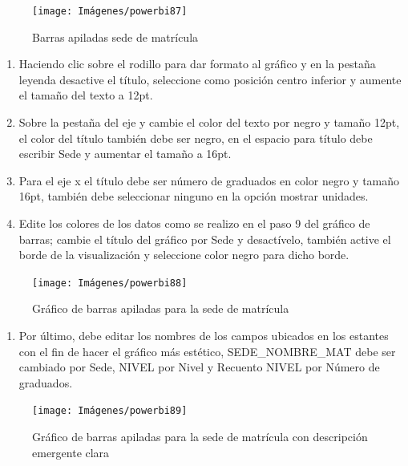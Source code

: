 \documentclass[
]{book}
\providecommand{\tightlist}{%
  \setlength{\itemsep}{0pt}\setlength{\parskip}{0pt}}
\begin{document}
\begin{figure}

{\centering \texttt{[image: Imágenes/powerbi87]} 

}

\caption{Barras apiladas sede de matrícula}\label{fig:paso3barrasapiladas-fig}
\end{figure}

\begin{enumerate}
\def\labelenumi{\arabic{enumi}.}
\setcounter{enumi}{3}
\item
  Haciendo clic sobre el rodillo para dar formato al gráfico y en la pestaña leyenda desactive el título, seleccione como posición centro inferior y aumente el tamaño del texto a 12pt.
\item
  Sobre la pestaña del eje y cambie el color del texto por negro y tamaño 12pt, el color del título también debe ser negro, en el espacio para título debe escribir Sede y aumentar el tamaño a 16pt.
\item
  Para el eje x el título debe ser número de graduados en color negro y tamaño 16pt, también debe seleccionar ninguno en la opción mostrar unidades.
\item
  Edite los colores de los datos como se realizo en el paso 9 del gráfico de barras; cambie el título del gráfico por Sede y desactívelo, también active el borde de la visualización y seleccione color negro para dicho borde.
\end{enumerate}

\begin{figure}

{\centering \texttt{[image: Imágenes/powerbi88]} 

}

\caption{Gráfico de barras apiladas para la sede de matrícula}\label{fig:paso7barrasapiladas-fig}
\end{figure}

\begin{enumerate}
\def\labelenumi{\arabic{enumi}.}
\setcounter{enumi}{7}
\tightlist
\item
  Por último, debe editar los nombres de los campos ubicados en los estantes con el fin de hacer el gráfico más estético, SEDE\_NOMBRE\_MAT debe ser cambiado por Sede, NIVEL por Nivel y Recuento NIVEL por Número de graduados.
\end{enumerate}

\begin{figure}

{\centering \texttt{[image: Imágenes/powerbi89]} 

}

\caption{Gráfico de barras apiladas para la sede de matrícula con descripción emergente clara}\label{fig:paso8barrasapiladas-fig}
\end{figure}
\end{document}
